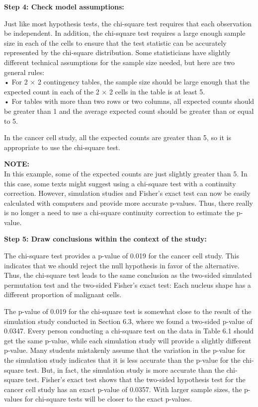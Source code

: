 \documentclass[
]{report}
\begin{document}
\textbf{Step 4: Check model assumptions:}

Just like most hypothesis tests, the chi-square test requires that each observation be independent. In addition, the chi-square test requires a large enough sample size in each of the cells to ensure that the test statistic can be accurately represented by the chi-square distribution. Some statisticians have slightly different technical assumptions for the sample size needed, but here are two general rules:\\
• For 2 × 2 contingency tables, the sample size should be large enough that the expected count in each of the 2 × 2 cells in the table is at least 5.\\
• For tables with more than two rows or two columns, all expected counts should be greater than 1 and the average expected count should be greater than or equal to 5.

In the cancer cell study, all the expected counts are greater than 5, so it is appropriate to use the chi-square test.

\large

\textbf{NOTE:}\\
In this example, some of the expected counts are just slightly greater than 5. In this case, some texts might suggest using a chi-square test with a continuity correction. However, simulation studies and Fisher's exact test can now be easily calculated with computers and provide more accurate p-values. Thus, there really is no longer a need to use a chi-square continuity correction to estimate the p-value.\\
\normalsize

\textbf{Step 5: Draw conclusions within the context of the study:}

The chi-square test provides a p-value of 0.019 for the cancer cell study. This indicates that we should reject the null hypothesis in favor of the alternative. Thus, the chi-square test leads to the same conclusion as the two-sided simulated permutation test and the two-sided Fisher's exact test: Each nucleus shape has a different proportion of malignant cells.

The p-value of 0.019 for the chi-square test is somewhat close to the result of the simulation study conducted in Section 6.3, where we found a two-sided p-value of 0.0347. Every person conducting a chi-square test on the data in Table 6.1 should get the same p-value, while each simulation study will provide a slightly different p-value. Many students mistakenly assume that the variation in the p-value for the simulation study indicates that it is less accurate than the p-value for the chi-square test. But, in fact, the simulation study is more accurate than the chi-square test. Fisher's exact test shows that the two-sided hypothesis test for the cancer cell study has an exact p-value of 0.0357. With larger sample sizes, the p-values for chi-square tests will be closer to the exact p-values.
\end{document}
